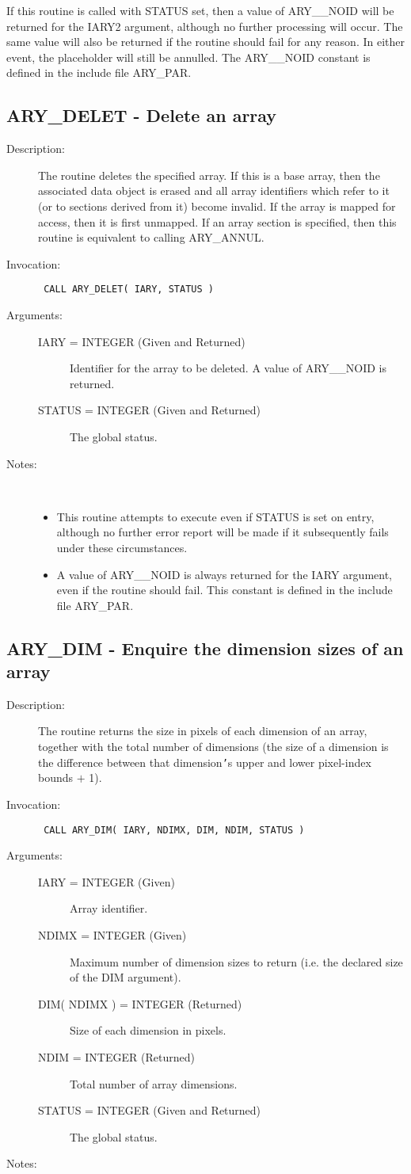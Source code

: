 \documentclass[twoside,11pt]{article}
\newcommand{\xlabel}[1]{}
\newlength{\sstbannerlength}
\newlength{\sstcaptionlength}
\newlength{\sstexampleslength}
\newlength{\sstexampleswidth}
\newcommand{\sstroutine}[3]{
   \goodbreak
   \rule{\textwidth}{0.5mm}
   \vspace{-7ex}
   \newline
   \settowidth{\sstbannerlength}{{\Large {\bf #1}}}
   \setlength{\sstcaptionlength}{\textwidth}
   \setlength{\sstexampleslength}{\textwidth}
   \addtolength{\sstbannerlength}{0.5em}
   \addtolength{\sstcaptionlength}{-2.0\sstbannerlength}
   \addtolength{\sstcaptionlength}{-5.0pt}
   \settowidth{\sstexampleswidth}{{\bf Examples:}}
   \addtolength{\sstexampleslength}{-\sstexampleswidth}
   \parbox[t]{\sstbannerlength}{\flushleft{\Large {\bf #1}}}
   \parbox[t]{\sstcaptionlength}{\center{\Large #2}}
   \parbox[t]{\sstbannerlength}{\flushright{\Large {\bf #1}}}
   \begin{description}
      #3
   \end{description}
}
\newcommand{\sstdescription}[1]{\item[Description:] #1}
\newcommand{\sstinvocation}[1]{\item[Invocation:]\hspace{0.4em}{\tt #1}}
\newcommand{\sstarguments}[1]{
   \item[Arguments:] \mbox{} \\
   \vspace{-3.5ex}
   \begin{description}
      #1
   \end{description}
}
\newcommand{\sstsubsection}[1]{ \item[{#1}] \mbox{} \\}
\newcommand{\sstnotes}[1]{\item[Notes:] \mbox{} \\[1.3ex] #1}
\newcommand{\sstitemlist}[1]{
  \mbox{} \\
  \vspace{-3.5ex}
  \begin{itemize}
     #1
  \end{itemize}
}
\newcommand{\sstitem}{\item}
\newcommand{\ssttt}{\tt}
\renewcommand{\sstroutine}[3]{
      \subsection{#1\xlabel{#1}-\label{#1}#2}
      \begin{description}
         #3
      \end{description}
   }
\renewcommand{\sstdescription}[1]{\item[Description:]
      \begin{description}
         #1
      \end{description}
   }
\renewcommand{\sstinvocation}[1]{\item[Invocation:]
      \begin{description}
         {\ssttt #1}
      \end{description}
   }
\renewcommand{\sstarguments}[1]{
      \item[Arguments:]
      \begin{description}
         #1
      \end{description}
   }
\renewcommand{\sstsubsection}[1]{\item[{#1}]}
\renewcommand{\sstnotes}[1]{\item[Notes:]
      \begin{description}
         #1
      \end{description}
   }
\newcommand{\sstitemlist}[1]{
      \begin{itemize}
         #1
      \end{itemize}
   }
\begin{document}
\begin{eqn*}
{{{         \sstitem
         If this routine is called with STATUS set, then a value of
         ARY\_\_NOID will be returned for the IARY2 argument, although no
         further processing will occur. The same value will also be
         returned if the routine should fail for any reason. In either
         event, the placeholder will still be annulled. The ARY\_\_NOID
         constant is defined in the include file ARY\_PAR.
      }
   }
}
\sstroutine{
   ARY\_DELET
}{
   Delete an array
}{
   \sstdescription{
      The routine deletes the specified array. If this is a base array,
      then the associated data object is erased and all array
      identifiers which refer to it (or to sections derived from it)
      become invalid. If the array is mapped for access, then it is
      first unmapped.  If an array section is specified, then this
      routine is equivalent to calling ARY\_ANNUL.
   }
   \sstinvocation{
      CALL ARY\_DELET( IARY, STATUS )
   }
   \sstarguments{
      \sstsubsection{
         IARY = INTEGER (Given and Returned)
      }{
         Identifier for the array to be deleted. A value of ARY\_\_NOID
         is returned.
      }
      \sstsubsection{
         STATUS = INTEGER (Given and Returned)
      }{
         The global status.
      }
   }
   \sstnotes{
      \sstitemlist{

         \sstitem
         This routine attempts to execute even if STATUS is set on
         entry, although no further error report will be made if it
         subsequently fails under these circumstances.

         \sstitem
         A value of ARY\_\_NOID is always returned for the IARY argument,
         even if the routine should fail. This constant is defined in the
         include file ARY\_PAR.
      }
   }
}
\sstroutine{
   ARY\_DIM
}{
   Enquire the dimension sizes of an array
}{
   \sstdescription{
      The routine returns the size in pixels of each dimension of an
      array, together with the total number of dimensions (the size of
      a dimension is the difference between that dimension{\tt '}s upper and
      lower pixel-index bounds $+$ 1).
   }
   \sstinvocation{
      CALL ARY\_DIM( IARY, NDIMX, DIM, NDIM, STATUS )
   }
   \sstarguments{
      \sstsubsection{
         IARY = INTEGER (Given)
      }{
         Array identifier.
      }
      \sstsubsection{
         NDIMX = INTEGER (Given)
      }{
         Maximum number of dimension sizes to return (i.e. the declared
         size of the DIM argument).
      }
      \sstsubsection{
         DIM( NDIMX ) = INTEGER (Returned)
      }{
         Size of each dimension in pixels.
      }
      \sstsubsection{
         NDIM = INTEGER (Returned)
      }{
         Total number of array dimensions.
      }
      \sstsubsection{
         STATUS = INTEGER (Given and Returned)
      }{
         The global status.
      }
   }
   \sstnotes{
      \sstitemlist{

}}}
\end{eqn*}
\end{document}
